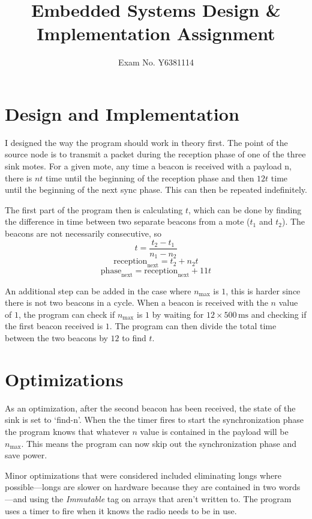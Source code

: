 \documentclass{article}
\newcommand\receptiont[1]{\text{reception}_\text{#1}}
\newcommand\phaset[1]{\text{phase}_\text{#1}}
\newcommand{\ms}{\, \mathrm{ms}}
\newcommand{\nmax}{n_{\text{max}}}
\begin{document}
\title{Embedded Systems Design \& Implementation Assignment}
\author{Exam No. Y6381114}
\maketitle

\section{Design and Implementation}

I designed the way the program should work in theory first. The point of the source node is to transmit a packet during the reception phase of one of the three sink motes. For a given mote, any time a beacon is received with a payload n, there is $n t$ time until the beginning of the reception phase and then $12 t$ time until the beginning of the next sync phase. This can then be repeated indefinitely.

The first part of the program then is calculating $t$, which can be done by finding the difference in time between two separate beacons from a mote ($t_1$ and $t_2$). The beacons are not necessarily consecutive, so 
\[t = \frac{t_2 - t_1}{n_1 - n_2}\]
\[\receptiont{next} = t_2 + n_2 t\]
\[\phaset{next} = \receptiont{next} + 11 t\]


An additional step can be added in the case where $\nmax$ is $1$, this is harder since there is not two beacons in a cycle. When a beacon is received with the $n$ value of $1$, the program can check if $\nmax$ is $1$ by waiting for $12 \times 500\ms$ and checking if the first beacon received is $1$. The program can then divide the total time between the two beacons by $12$ to find $t$.

\section{Optimizations}

As an optimization, after the second beacon has been received, the state of the sink is set to `find-n'. When the the timer fires to start the synchronization phase the program knows that whatever $n$ value is contained in the payload will be $\nmax$. This means the program can now skip out the synchronization phase and save power.

Minor optimizations that were considered included eliminating longs where possible---longs are slower on hardware because they are contained in two words---and using the \emph{Immutable} tag on arrays that aren't written to. The program uses a timer to fire when it knows the radio needs to be in use.
\end{document}
